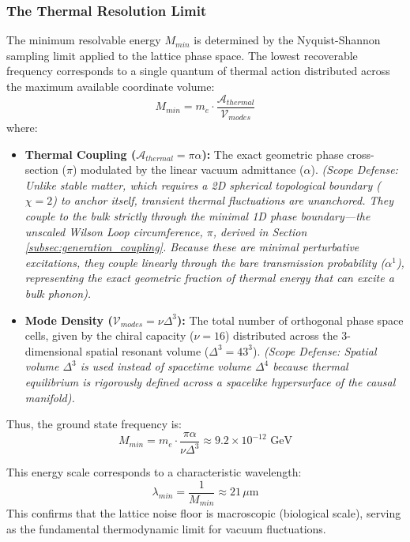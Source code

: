 \subsubsection{The Thermal Resolution Limit}
The minimum resolvable energy $M_{min}$ is determined by the Nyquist-Shannon sampling limit applied to the lattice phase space. The lowest recoverable frequency corresponds to a single quantum of thermal action distributed across the maximum available coordinate volume:
\begin{equation}
    M_{min} = m_e \cdot \frac{\mathcal{A}_{thermal}}{\mathcal{V}_{modes}}
\end{equation}
where:
\begin{itemize}
    \item \textbf{Thermal Coupling ($\mathcal{A}_{thermal} = \pi\alpha$):} The exact geometric phase cross-section ($\pi$) modulated by the linear vacuum admittance ($\alpha$). \textit{(Scope Defense: Unlike stable matter, which requires a 2D spherical topological boundary ($\chi=2$) to anchor itself, transient thermal fluctuations are unanchored. They couple to the bulk strictly through the minimal 1D phase boundary---the unscaled Wilson Loop circumference, $\pi$, derived in Section \ref{subsec:generation_coupling}. Because these are minimal perturbative excitations, they couple linearly through the bare transmission probability ($\alpha^1$), representing the exact geometric fraction of thermal energy that can excite a bulk phonon).}
    \item \textbf{Mode Density ($\mathcal{V}_{modes} = \nu\Delta^3$):} The total number of orthogonal phase space cells, given by the chiral capacity ($\nu=16$) distributed across the 3-dimensional spatial resonant volume ($\Delta^3 = 43^3$). \textit{(Scope Defense: Spatial volume $\Delta^3$ is used instead of spacetime volume $\Delta^4$ because thermal equilibrium is rigorously defined across a spacelike hypersurface of the causal manifold).}
\end{itemize}

Thus, the ground state frequency is:
\begin{equation}
    M_{min} = m_e \cdot \frac{\pi\alpha}{\nu\Delta^3} 
    \approx 9.2 \times 10^{-12} \text{ GeV}
\end{equation}

This energy scale corresponds to a characteristic wavelength:
\begin{equation}
    \lambda_{min} = \frac{1}{M_{min}} \approx 21 \, \mu\text{m}
\end{equation}
This confirms that the lattice noise floor is macroscopic (biological scale), serving as the fundamental thermodynamic limit for vacuum fluctuations.

